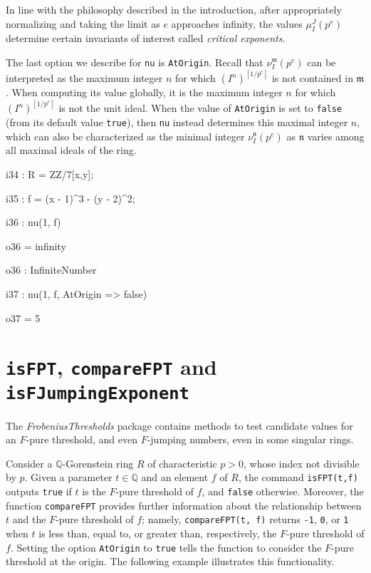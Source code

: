 \documentclass{amsart}
\newcommand{\idealm}{\mathfrak{m}}
\begin{document}
 In line with the philosophy described in the introduction, after appropriately normalizing and taking the limit as $e$ approaches infinity, the values $\mu_I^J(p^e)$ determine certain invariants of interest called \emph{critical exponents}.

The last option we describe for \texttt{nu} is \texttt{AtOrigin}.
Recall that $\nu_I^\idealm(p^e)$ can be interpreted as the maximum integer $n$ for which $(I^n)^{[1/p^e]}$ is not contained in $\idealm$. 
When computing its value globally, it is the maximum integer $n$ for which $(I^n)^{[1/p^e]}$ is not the unit ideal.  When 
the value of \texttt{AtOrigin} is set to \texttt{false} (from its default value \texttt{true}), then \texttt{nu} instead determines this maximal integer $n$, which can also be characterized as the minimal integer $\nu_I^\mathfrak{n}(p^e)$ as $\mathfrak{n}$ varies among all maximal ideals of the ring.  

%

\bigskip
{\small
{}
\begin{MyVerbatim}
i34 : R = ZZ/7[x,y];

i35 : f = (x - 1)^3 - (y - 2)^2;

i36 : nu(1, f)

o36 = infinity

o36 : InfiniteNumber

i37 : nu(1, f, AtOrigin => false)

o37 = 5
\end{MyVerbatim}
}


\section{{\tt isFPT}, {\tt compareFPT} and {\tt isFJumpingExponent}}
\label{sec.IsFPT}

The \emph{FrobeniusThresholds} package contains methods to
 test candidate values for an $F$-pure threshold, and even $F$-jumping numbers, even in some singular rings.

Consider a  $\mathbb{Q}$-Gorenstein ring $R$ of characteristic $p>0$, whose index not divisible by $p$.
Given a parameter $t \in \mathbb{Q}$ and an element $f$ of $R$, the command \texttt{isFPT(t,f)} outputs \texttt{true} if $t$ is the $F$-pure threshold of $f$, and \texttt{false} otherwise.
Moreover, the function \texttt{compareFPT} provides further information about the relationship between $t$ and the $F$-pure threshold of $f$; namely,
\texttt{compareFPT(t, f)} returns {\tt-1}, \texttt{0}, or \texttt{1} when $t$ is less than, equal to, or greater than, respectively, the $F$-pure threshold of $f$.  Setting the option \texttt{AtOrigin} to \texttt{true} tells the function to consider the $F$-pure threshold at the origin.  The following example illustrates this functionality.
\end{document}
